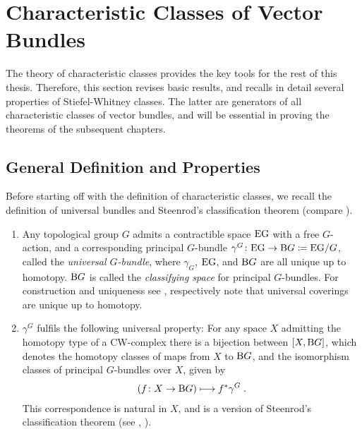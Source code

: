 \section{Characteristic Classes of Vector Bundles}\label{sec:charclsofvb}
The theory of characteristic classes provides the key tools
for the rest of this thesis. Therefore, this section
revises basic results, and recalls in detail several properties
of Stiefel-Whitney classes. The latter are generators of all
characteristic classes of vector bundles, and will be essential in
proving the theorems of the subsequent chapters.

\subsection{General Definition and Properties}
Before starting off with the definition of characteristic classes,
we recall the definition of universal bundles and Steenrod's
classification theorem (compare \cite[Chapter~14.4]{tomdieck}).
\begin{LemDef}\label{def:charcls}
  \begin{enumerate}
  \item Any topological group $G$ admits a contractible space $\mathrm{E}\mathrm{G}$ with a
    free $G$-action, and a corresponding principal $G$-bundle
    $\gamma^G\colon \mathrm{E}\mathrm{G}\to\mathrm{B}G\coloneqq \mathrm{E}\mathrm{G}/G$, called the
    \emph{universal $G$-bundle},
    where $\gamma_G$, $\mathrm{E}\mathrm{G}$, and $\mathrm{B}G$ are all unique up to
    homotopy.
    $\mathrm{B}G$ is called the \emph{classifying space} for principal
    $G$-bundles.
    For construction and uniqueness see \cite[Example~1B.7~ff.]{hatcher},
    respectively note that universal coverings are unique up to homotopy.
  \item\label{item:classificationthm}
    $\gamma^G$ fulfils the following universal property:
    For any space $X$ admitting the homotopy type of a CW-complex
    there is a bijection between $[X,\mathrm{B}G]$, which denotes the homotopy
    classes of maps from $X$ to $\mathrm{B}G$, and the isomorphism classes of
    principal $G$-bundles over $X$, given by
    \begin{gather*}
      \left(f\colon X\to\mathrm{B}G \right) \longmapsto {f}^* \gamma^G
      \;.
    \end{gather*}
    This correspondence is natural in $X$, and is a version of
    Steenrod's classification theorem
    (see 
    \cite[Theorem~14.4.1]{tomdieck},
    \cite[Theorem~1.4, p.~75]{immersionconj}).
  \end{enumerate}
\end{LemDef}

